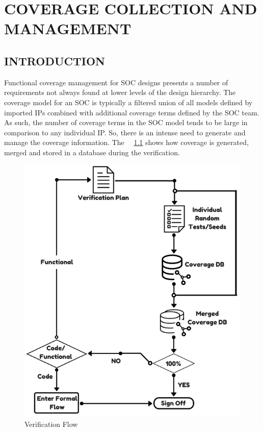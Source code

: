 \chapter{COVERAGE COLLECTION AND MANAGEMENT}
\label{chap:coverage}

\section{INTRODUCTION}
Functional coverage management for SOC designs presents a number of requirements not always found at lower levels of the design hierarchy. The coverage model for an SOC is typically a filtered union of all models defined by imported IPs combined with additional coverage terms defined by the SOC team. As such, the number of coverage terms in the SOC model tends to be large in comparison to any individual IP. So, there is an intense need to generate and manage the coverage information. The ~\figurename~{\ref{fig:verif_flow.png}} shows how coverage is generated, merged and stored in a database during the verification.
\vspace{15pt}
\begin{figure}[h!]
\centering
\includegraphics[scale=0.8]{./figures/verif_flow.png}
\caption{Verification Flow}
\label{fig:verif_flow.png}
\end{figure}

